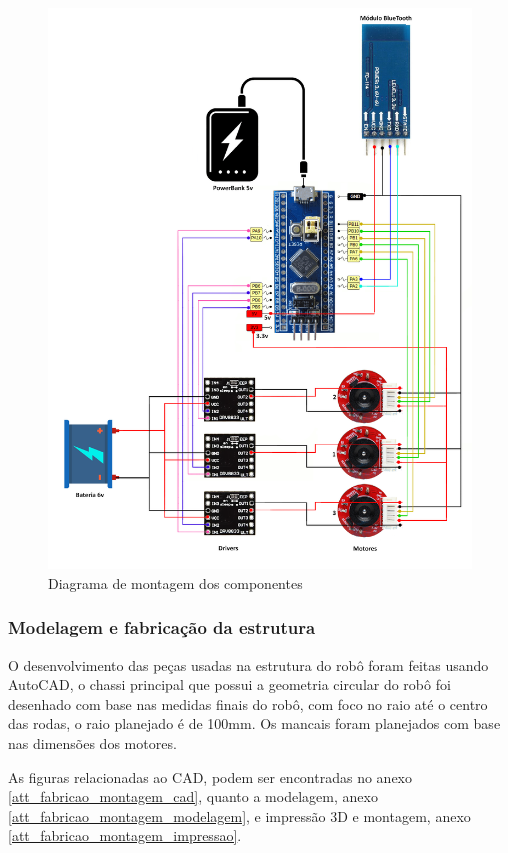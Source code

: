 \begin{figure}[htb]
	\centering
	\includegraphics[width=1.0\textwidth]{figures/diagrama_montagem}
	\caption{Diagrama de montagem dos componentes}
	\label{fig:diagrama_montagem}
\end{figure}


\subsubsection{Modelagem e fabricação da estrutura}

O desenvolvimento das peças usadas na estrutura do robô foram feitas usando AutoCAD, o chassi principal que possui a geometria circular do robô foi desenhado com base nas medidas finais do robô,
com foco no raio até o centro das rodas, o raio planejado é de 100mm. Os mancais foram planejados com base nas dimensões dos motores. 

As figuras relacionadas ao CAD, podem ser encontradas no anexo \ref{att_fabricao_montagem_cad}, quanto a modelagem,
anexo \ref{att_fabricao_montagem_modelagem}, e impressão 3D e montagem, anexo \ref{att_fabricao_montagem_impressao}.



